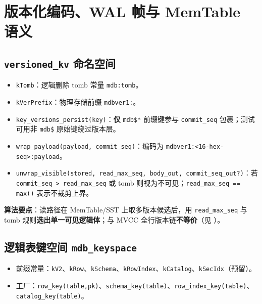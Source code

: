 \section{版本化编码、WAL 帧与 MemTable 语义}
\label{sec:mod-versioning}

\subsection{\texttt{versioned\_kv} 命名空间}


\begin{itemize}
  \item \texttt{kTomb}：逻辑删除 tomb 常量 \texttt{mdb:tomb}。
  \item \texttt{kVerPrefix}：物理存储前缀 \texttt{mdbver1:}。
  \item \texttt{key\_versions\_persist(key)}：\textbf{仅} \texttt{mdb\$*} 前缀键参与 \texttt{commit\_seq} 包裹；测试可用非 \texttt{mdb\$} 原始键绕过版本层。
  \item \texttt{wrap\_payload(payload, commit\_seq)}：编码为 \texttt{mdbver1:<16-hex-seq>:payload}。
  \item \texttt{unwrap\_visible(stored, read\_max\_seq, body\_out, commit\_seq\_out?)}：若 \texttt{commit\_seq > read\_max\_seq} 或 tomb 则视为不可见；\texttt{read\_max\_seq == max()} 表示不裁剪上界。
\end{itemize}

\textbf{算法要点}：读路径在 MemTable/SST 上取多版本候选后，用 \texttt{read\_max\_seq} 与 tomb 规则\textbf{选出单一可见逻辑体}；与 MVCC 全行版本链\textbf{不等价}（见 ）。

\subsection{逻辑表键空间 \texttt{mdb\_keyspace}}


\begin{itemize}
  \item 前缀常量：\texttt{kV2}、\texttt{kRow}、\texttt{kSchema}、\texttt{kRowIndex}、\texttt{kCatalog}、\texttt{kSecIdx}（预留）。
  \item 工厂：\texttt{row\_key(table,pk)}、\texttt{schema\_key(table)}、\texttt{row\_index\_key(table)}、\texttt{catalog\_key(table)}。
\end{itemize}

